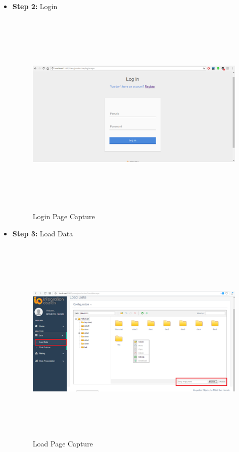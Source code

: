 \begin{appendix}
\begin{itemize}
\item \textbf{Step 2:} Login\\

\begin{figure}[!ht]
\begin{center}
\includegraphics[width=17cm,height=10cm]{chapter5/login.png}
\end{center}
\caption{Login Page Capture}
\label{login}
\end{figure} 

\item \textbf{Step 3:} Load Data\\

\begin{figure}[!ht]
\begin{center}
\includegraphics[width=17cm,height=10cm]{chapter5/load.png}
\end{center}
\caption{Load Page Capture}
\label{l}
\end{figure} 



\end{itemize}
\end{appendix}

